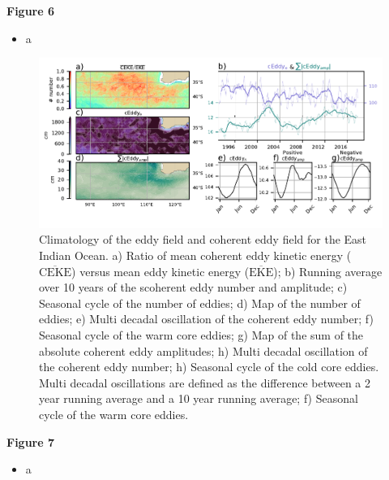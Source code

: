 \documentclass[draft,linenumbers]{agujournal2019}
\newcommand{\MEKE}{\overline{\textrm{EKE}}}
\newcommand{\MCEKE}{\overline{\textrm{CEKE}}}
\begin{document}
	\textbf{Figure 6}
	\begin{itemize}
		\item a
	\end{itemize}

	\begin{figure}
	    \centering
	    \includegraphics[width=1\textwidth]{figures/regional_ratios_and_stats_V3_0.pdf}
	    \caption{ Climatology of the eddy field and coherent eddy field for the East Indian Ocean. a) Ratio of mean coherent eddy kinetic energy ($\MCEKE$) versus mean eddy kinetic energy ($\MEKE$); b) Running average over 10 years of the scoherent eddy number and amplitude; c) Seasonal cycle of the number of eddies; d) Map of the number of eddies; 
		e) Multi decadal oscillation of the coherent eddy number; f) Seasonal cycle of the warm core eddies; g) Map of the sum of the absolute coherent eddy amplitudes;  h) Multi decadal oscillation of the coherent eddy number; h) Seasonal cycle of the cold core eddies. Multi decadal oscillations are defined as the difference between a 2 year running average and a 10 year running average; f) Seasonal cycle of the warm core eddies.}
	    \label{fig:east_indian_cycle}
	\end{figure}

	\textbf{Figure 7}
	\begin{itemize}
		\item a
	\end{itemize}
\end{document}

